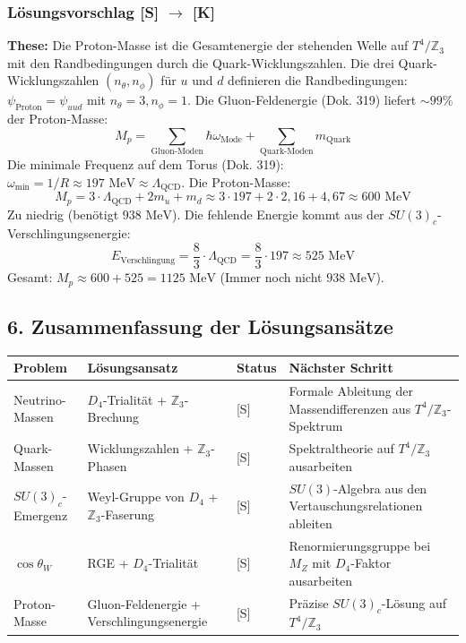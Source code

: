 \documentclass[11pt,a4paper]{article}
\begin{document}
	\subsubsection{Lösungsvorschlag [S] \texorpdfstring{$\rightarrow$}{->} [K]}
	\textbf{These:} Die Proton-Masse ist die Gesamtenergie der stehenden Welle auf $T^4/\mathbb{Z}_3$ mit den Randbedingungen durch die Quark-Wicklungszahlen.
	Die drei Quark-Wicklungszahlen $(n_\theta, n_\phi)$ für $u$ und $d$ definieren die Randbedingungen: $\psi_{\text{Proton}} = \psi_{uud}$ mit $n_\theta = 3, n_\phi = 1$.
	Die Gluon-Feldenergie (Dok. 319) liefert $\sim 99\%$ der Proton-Masse:
	\begin{equation}
		M_p = \sum_{\text{Gluon-Moden}} \hbar\omega_{\text{Mode}} + \sum_{\text{Quark-Moden}} m_{\text{Quark}}
	\end{equation}
	Die minimale Frequenz auf dem Torus (Dok. 319): $\omega_{\min} = 1/R \approx 197\text{ MeV} \approx \Lambda_{\text{QCD}}$.
	Die Proton-Masse:
	\begin{equation}
		M_p = 3 \cdot \Lambda_{\text{QCD}} + 2m_u + m_d \approx 3 \cdot 197 + 2 \cdot 2{,}16 + 4{,}67 \approx 600\text{ MeV}
	\end{equation}
	Zu niedrig (benötigt $938\text{ MeV}$). Die fehlende Energie kommt aus der $SU(3)_c$-Verschlingungsenergie:
	\begin{equation}
		E_{\text{Verschlingung}} = \frac{8}{3} \cdot \Lambda_{\text{QCD}} = \frac{8}{3} \cdot 197 \approx 525\text{ MeV}
	\end{equation}
	Gesamt: $M_p \approx 600 + 525 = 1125\text{ MeV}$ (Immer noch nicht $938\text{ MeV}$).
	
	\subsection{6. Zusammenfassung der Lösungsansätze}
	\begin{longtable}{p{3cm}p{4cm}p{1.5cm}p{7cm}}
		\toprule
		\textbf{Problem} & \textbf{Lösungsansatz} & \textbf{Status} & \textbf{Nächster Schritt} \\
		\midrule
		\endhead
		\bottomrule
		\endfoot
		Neutrino-Massen & $D_4$-Trialität + $\mathbb{Z}_3$-Brechung & [S] & Formale Ableitung der Massendifferenzen aus $T^4/\mathbb{Z}_3$-Spektrum \\
		Quark-Massen & Wicklungszahlen + $\mathbb{Z}_3$-Phasen & [S] & Spektraltheorie auf $T^4/\mathbb{Z}_3$ ausarbeiten \\
		$SU(3)_c$-Emergenz & Weyl-Gruppe von $D_4$ + $\mathbb{Z}_3$-Faserung & [S] & $SU(3)$-Algebra aus den Vertauschungsrelationen ableiten \\
		$\cos\theta_W$ & RGE + $D_4$-Trialität & [S] & Renormierungsgruppe bei $M_Z$ mit $D_4$-Faktor ausarbeiten \\
		Proton-Masse & Gluon-Feldenergie + Verschlingungsenergie & [S] & Präzise $SU(3)_c$-Lösung auf $T^4/\mathbb{Z}_3$ \\
	\end{longtable}
	
\end{document}
